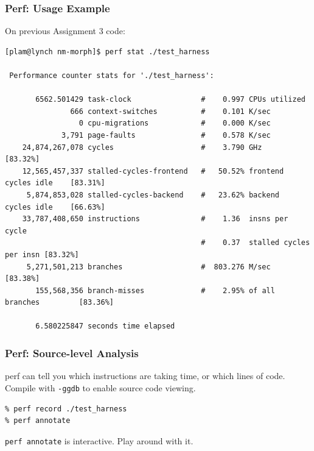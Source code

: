 \begin{frame}[fragile]
  \frametitle{Perf: Usage Example}

\large
\begin{changemargin}{1.5cm}
On previous Assignment 3 code:
\begin{lstlisting}[basicstyle=\tiny]
[plam@lynch nm-morph]$ perf stat ./test_harness

 Performance counter stats for './test_harness':

       6562.501429 task-clock                #    0.997 CPUs utilized          
               666 context-switches          #    0.101 K/sec                  
                 0 cpu-migrations            #    0.000 K/sec                  
             3,791 page-faults               #    0.578 K/sec                  
    24,874,267,078 cycles                    #    3.790 GHz                     [83.32%]
    12,565,457,337 stalled-cycles-frontend   #   50.52% frontend cycles idle    [83.31%]
     5,874,853,028 stalled-cycles-backend    #   23.62% backend  cycles idle    [66.63%]
    33,787,408,650 instructions              #    1.36  insns per cycle        
                                             #    0.37  stalled cycles per insn [83.32%]
     5,271,501,213 branches                  #  803.276 M/sec                   [83.38%]
       155,568,356 branch-misses             #    2.95% of all branches         [83.36%]

       6.580225847 seconds time elapsed
\end{lstlisting} %
\end{changemargin}
\end{frame}

\begin{frame}[fragile]
  \frametitle{Perf: Source-level Analysis}


\large
\begin{changemargin}{1.5cm}
perf can tell you which instructions are taking time, or which lines of code.\\[1em]

Compile with {\tt -ggdb} to enable source code viewing.

\begin{lstlisting}
% perf record ./test_harness
% perf annotate
\end{lstlisting}

{\tt perf annotate} is interactive. Play around with it.
\end{changemargin}

\end{frame}

